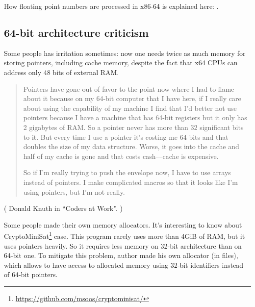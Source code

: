 How floating point numbers are processed in x86-64 is explained here: .

\subsection{64-bit architecture criticism}

Some people has irritation sometimes: now one needs twice as much memory for storing pointers,
including cache memory, despite the fact that x64 \ac{CPU}s can address only 48 bits of external 
\ac{RAM}.

\begin{framed}
\begin{quotation}
Pointers have gone out of favor to the point now where I had to
flame about it because on my 64-bit computer that I have here, if I really
care about using the capability of my machine I find that I’d better not use
pointers because I have a machine that has 64-bit registers but it only has 2
gigabytes of RAM. So a pointer never has more than 32 significant bits to it.
But every time I use a pointer it’s costing me 64 bits and that doubles the
size of my data structure. Worse, it goes into the cache and half of my
cache is gone and that costs cash—cache is expensive.

So if I’m really trying to push the envelope now, I have to use arrays instead
of pointers. I make complicated macros so that it looks like I’m using
pointers, but I’m not really.
\end{quotation}
\end{framed}

( Donald Knuth in ``Coders at Work''. )

Some people made their own memory allocators.
It's interesting to know about CryptoMiniSat\footnote{\url{https://github.com/msoos/cryptominisat/}} case.
This program rarely uses more than 4GiB of \ac{RAM}, but it uses pointers heavily.
So it requires less memory on 32-bit architecture than on 64-bit one.
To mitigate this problem, author made his own allocator (in  files),
which allows to have access to allocated memory using 32-bit identifiers instead of 64-bit pointers.
